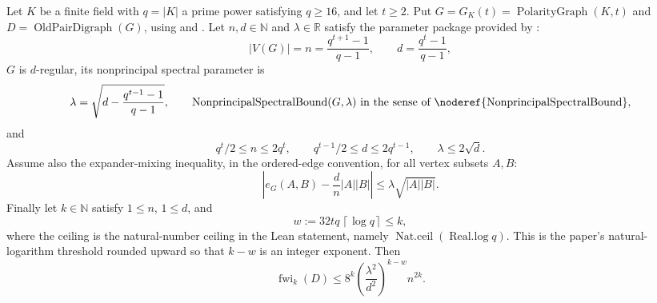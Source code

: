 \begin{lemma}
Let $K$ be a finite field with $q=|K|$ a prime power satisfying $q\geq16$,
and let $t\geq2$.  Put
$G=G_K(t)=\operatorname{PolarityGraph}(K,t)$ and
$D=\operatorname{OldPairDigraph}(G)$, using
 and .  Let
$n,d\in\mathbb N$ and $\lambda\in\mathbb R$ satisfy the parameter package
provided by :
\[
 |V(G)|=n=\frac{q^{t+1}-1}{q-1},\qquad
 d=\frac{q^t-1}{q-1},
\]
$G$ is $d$-regular, its nonprincipal spectral parameter is
\[
 \lambda=\sqrt{d-\frac{q^{t-1}-1}{q-1}},
 \qquad
 \operatorname{NonprincipalSpectralBound}(G,\lambda)
 \text{ in the sense of \noderef{NonprincipalSpectralBound}},
\]
and
\[
 q^t/2\leq n\leq2q^t,\qquad
 q^{t-1}/2\leq d\leq2q^{t-1},\qquad
 \lambda\leq2\sqrt d.
\]
Assume also the expander-mixing inequality, in the ordered-edge convention,
for all vertex subsets $A,B$:
\[
 \left|e_G(A,B)-\frac d n|A||B|\right|
 \leq \lambda\sqrt{|A||B|}.
\]
Finally let $k\in\mathbb N$ satisfy $1\leq n$, $1\leq d$, and
\[
 w:=32tq\,\left\lceil\log q\right\rceil\leq k,
\]
where the ceiling is the natural-number ceiling in the Lean statement,
namely $\operatorname{Nat.ceil}(\operatorname{Real.log}q)$.  This is the
paper's natural-logarithm threshold rounded upward so that $k-w$ is an
integer exponent.
Then
\[
 \operatorname{fwi}_k(D)\leq
 8^k\left(\frac{\lambda^2}{d^2}\right)^{k-w}n^{2k}.
\]
\end{lemma}
